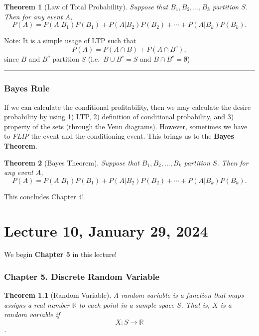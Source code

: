 \documentclass[
]{book}
\newtheorem{theorem}{Theorem}[chapter]
\theoremstyle{definition}
\theoremstyle{definition}
\theoremstyle{definition}
\theoremstyle{definition}
\theoremstyle{remark}
\begin{document}
\begin{theorem}[Law of Total Probability]
Suppose that \(B_1,B_2,...,B_k\) partition \(S\). Then for any event \(A\),
\[
P(A) = P(A | B_1) P(B_1) + P(A | B_2) P(B_2) + \cdots +P(A | B_k) P(B_k).
\]
\end{theorem}

Note: It is a simple usage of LTP such that
\[
  P(A) = P(A\cap B) + P(A \cap B^c),
\]
since \(B\) and \(B^c\) partition \(S\) (i.e.~\(B\cup B^c = S\) and \(B\cap B^c = \emptyset\))

\begin{center}\rule{0.5\linewidth}{0.5pt}\end{center}

\hypertarget{bayes-rule}{%
\subsection{Bayes Rule}\label{bayes-rule}}

If we can calculate the conditional profitability, then we may calculate the desire probability by using 1) LTP, 2) definition of conditional probability, and 3) property of the sets (through the Venn diagrams). However, sometimes we have to \emph{FLIP} the event and the conditioning event. This brings us to the \textbf{Bayes Theorem}.

\begin{theorem}[Bayes Theorem]
Suppose that \(B_1,B_2,...,B_k\) partition \(S\). Then for any event \(A\),
\[
P(A) = P(A | B_1) P(B_1) + P(A | B_2) P(B_2) + \cdots +P(A | B_k) P(B_k).
\]
\end{theorem}

This concludes Chapter 4!.

\hypertarget{lecture-10-january-29-2024}{%
\chapter{Lecture 10, January 29, 2024}\label{lecture-10-january-29-2024}}

We begin \textbf{Chapter 5} in this lecture!

\hypertarget{chapter-5.-discrete-random-variable}{%
\subsection{Chapter 5. Discrete Random Variable}\label{chapter-5.-discrete-random-variable}}

\begin{theorem}[Random Variable]
A \emph{random variable} is a function that maps assigns a real number \(\mathbb{R}\) to each point in a sample space \(S\). That is, \(X\) is a random variable if
\[X:S\to \mathbb{R}\].
\end{theorem}
\end{document}
